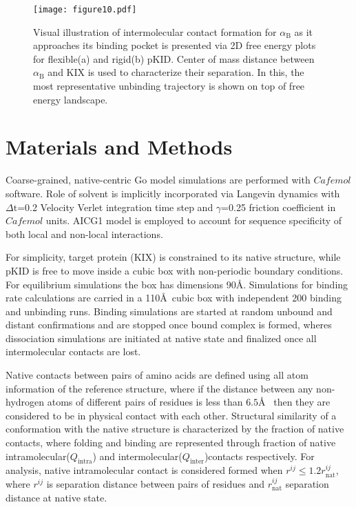 \documentclass[../talant.diss.submit.tex]{subfiles}
\begin{document}
\begin{figure}[h!]
  \centering
  \texttt{[image: figure10.pdf]}
  \caption{Visual illustration of intermolecular contact formation for
    $\alpha_{\mathrm{B}}$ as it approaches its binding pocket is presented via
    2D free energy plots for flexible(a) and rigid(b) pKID.  Center of mass
    distance between $\alpha_{\mathrm{B}}$ and KIX is used to characterize their
    separation. In this, the most representative unbinding trajectory is shown
    on top of free energy landscape.}
  \label{fig:figure9}
\end{figure}

%
\section{\textbf{Materials and Methods}}\label{sect:three_seven}
%
Coarse-grained, native-centric Go model\cite{okazaki:06} simulations are
performed with $\textit{Cafemol}$\cite{Kenzaki:11} software. Role of solvent is
implicitly incorporated via Langevin dynamics with $\Delta \mathrm{t}$=0.2
Velocity Verlet integration time step and $\gamma$=0.25 friction coefficient in
$\textit{Cafemol}$ units. AICG1 model\cite{li:11} is employed to account for
sequence specificity of both local and non-local interactions.

For simplicity, target protein (KIX) is constrained to its native structure,
while pKID is free to move inside a cubic box with non-periodic boundary
conditions. For equilibrium simulations the box has dimensions
90\AA. Simulations for binding rate calculations are carried in a 110\AA~cubic
box with independent 200 binding and unbinding runs. Binding simulations are
started at random unbound and distant confirmations and are stopped once bound
complex is formed, wheres dissociation simulations are initiated at native state
and finalized once all intermolecular contacts are lost.

Native contacts between pairs of amino acids are defined using all atom
information of the reference structure, where if the distance between any
non-hydrogen atoms of different pairs of residues is less than $6.5$\AA~ then
they are considered to be in physical contact with each other.  Structural
similarity of a conformation with the native structure is characterized by the
fraction of native contacts, where folding and binding are represented through
fraction of native intramolecular($Q_{\mathrm{intra}}$) and
intermolecular($Q_{\mathrm{inter}}$)contacts respectively.  For analysis, native
intramolecular contact is considered formed when
$r^{ij} \leq 1.2r_{\mathrm{nat}}^{ij}$, where $r^{ij}$ is separation distance
between pairs of residues and $r_{\mathrm{nat}}^{ij}$ separation distance at
native state.
\end{document}
